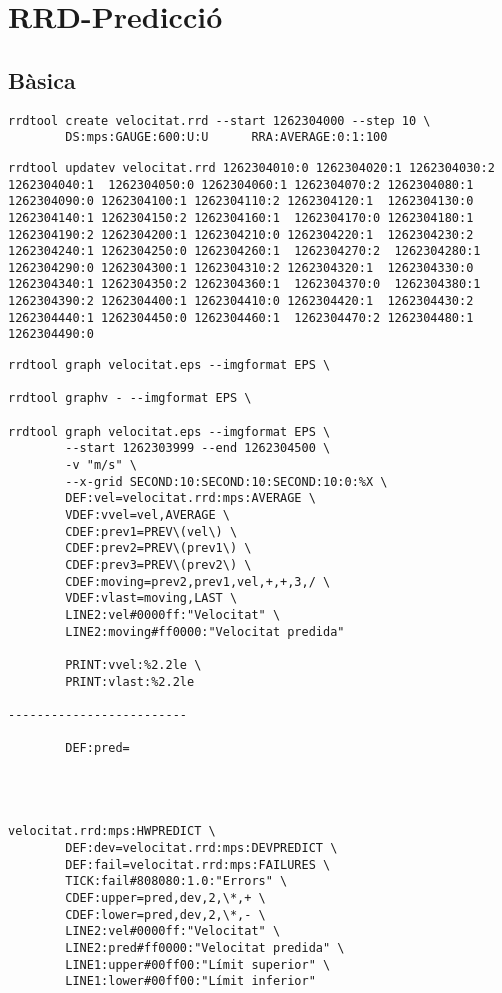 \chapter{RRD-Predicció}


\section{Bàsica}

\begin{lstlisting}
rrdtool create velocitat.rrd --start 1262304000 --step 10 \
        DS:mps:GAUGE:600:U:U      RRA:AVERAGE:0:1:100     
\end{lstlisting}


\begin{lstlisting}
rrdtool updatev velocitat.rrd 1262304010:0 1262304020:1 1262304030:2 1262304040:1  1262304050:0 1262304060:1 1262304070:2 1262304080:1  1262304090:0 1262304100:1 1262304110:2 1262304120:1  1262304130:0 1262304140:1 1262304150:2 1262304160:1  1262304170:0 1262304180:1  1262304190:2 1262304200:1 1262304210:0 1262304220:1  1262304230:2 1262304240:1 1262304250:0 1262304260:1  1262304270:2  1262304280:1  1262304290:0 1262304300:1 1262304310:2 1262304320:1  1262304330:0 1262304340:1 1262304350:2 1262304360:1  1262304370:0  1262304380:1  1262304390:2 1262304400:1 1262304410:0 1262304420:1  1262304430:2 1262304440:1 1262304450:0 1262304460:1  1262304470:2 1262304480:1  1262304490:0
\end{lstlisting}

\begin{lstlisting}
rrdtool graph velocitat.eps --imgformat EPS \

rrdtool graphv - --imgformat EPS \

rrdtool graph velocitat.eps --imgformat EPS \
        --start 1262303999 --end 1262304500 \
        -v "m/s" \
        --x-grid SECOND:10:SECOND:10:SECOND:10:0:%X \
        DEF:vel=velocitat.rrd:mps:AVERAGE \
        VDEF:vvel=vel,AVERAGE \
        CDEF:prev1=PREV\(vel\) \
        CDEF:prev2=PREV\(prev1\) \
        CDEF:prev3=PREV\(prev2\) \
        CDEF:moving=prev2,prev1,vel,+,+,3,/ \
        VDEF:vlast=moving,LAST \
        LINE2:vel#0000ff:"Velocitat" \
        LINE2:moving#ff0000:"Velocitat predida" 

        PRINT:vvel:%2.2le \
        PRINT:vlast:%2.2le 

-------------------------

        DEF:pred=




velocitat.rrd:mps:HWPREDICT \
        DEF:dev=velocitat.rrd:mps:DEVPREDICT \
        DEF:fail=velocitat.rrd:mps:FAILURES \
        TICK:fail#808080:1.0:"Errors" \
        CDEF:upper=pred,dev,2,\*,+ \
        CDEF:lower=pred,dev,2,\*,- \
        LINE2:vel#0000ff:"Velocitat" \
        LINE2:pred#ff0000:"Velocitat predida" \
        LINE1:upper#00ff00:"Límit superior" \
        LINE1:lower#00ff00:"Límit inferior" 
\end{lstlisting}





